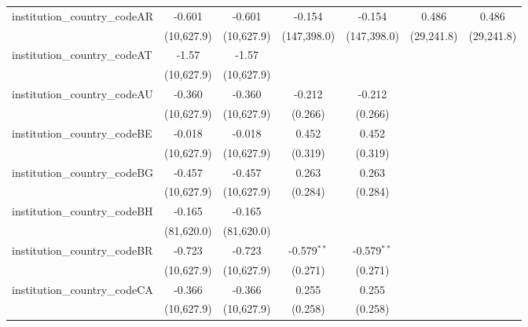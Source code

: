 \begin{tabular}{lcccccc}
   institution\_country\_codeAR          & -0.601        & -0.601        & -0.154        & -0.154        & 0.486         & 0.486\\   
                                         & (10,627.9)    & (10,627.9)    & (147,398.0)   & (147,398.0)   & (29,241.8)    & (29,241.8)\\   
   institution\_country\_codeAT          & -1.57         & -1.57         &               &               &               &   \\   
                                         & (10,627.9)    & (10,627.9)    &               &               &               &   \\   
   institution\_country\_codeAU          & -0.360        & -0.360        & -0.212        & -0.212        &               &   \\   
                                         & (10,627.9)    & (10,627.9)    & (0.266)       & (0.266)       &               &   \\   
   institution\_country\_codeBE          & -0.018        & -0.018        & 0.452         & 0.452         &               &   \\   
                                         & (10,627.9)    & (10,627.9)    & (0.319)       & (0.319)       &               &   \\   
   institution\_country\_codeBG          & -0.457        & -0.457        & 0.263         & 0.263         &               &   \\   
                                         & (10,627.9)    & (10,627.9)    & (0.284)       & (0.284)       &               &   \\   
   institution\_country\_codeBH          & -0.165        & -0.165        &               &               &               &   \\   
                                         & (81,620.0)    & (81,620.0)    &               &               &               &   \\   
   institution\_country\_codeBR          & -0.723        & -0.723        & -0.579$^{**}$ & -0.579$^{**}$ &               &   \\   
                                         & (10,627.9)    & (10,627.9)    & (0.271)       & (0.271)       &               &   \\   
   institution\_country\_codeCA          & -0.366        & -0.366        & 0.255         & 0.255         &               &   \\   
                                         & (10,627.9)    & (10,627.9)    & (0.258)       & (0.258)       &               &   \\   

\end{tabular}
